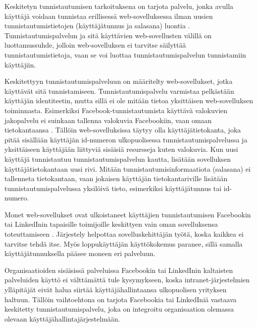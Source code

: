 Keskitetyn tunnistautumisen tarkoituksena on tarjota palvelu, jonka avulla käyttäjä voidaan tunnistaa erillisessä web-sovelluksessa ilman uusien tunnistautumistietojen (käyttäjätunnus ja salasana) luontia \cite{facebook}. Tunnistautumispalvelun ja sitä käyttävien web-sovellusten välillä on luottamussuhde, jolloin web-sovelluksen ei tarvitse säilyttää tunnistautumistietoja, vaan se voi luottaa tunnistautumispalvelun tunnistamiin käyttäjiin.

Keskitettyyn tunnistautumispalveluun on määritelty web-sovellukset, jotka käyttävät sitä tunnistamiseen. Tunnistautumispalvelu varmistaa pelkästään käyttäjän identiteetin, mutta sillä ei ole mitään tietoa yksittäisen web-sovelluksen toiminnasta. Esimerkiksi Facebook-tunnistautumista käyttävä valokuvien jakopalvelu ei suinkaan tallenna valokuvia Facebookiin, vaan omaan tietokantaansa \cite{web_resources}. Tällöin web-sovelluksissa täytyy olla käyttäjätietokanta, joka pitää sisällään käyttäjän id-numeron ulkopuolisessa tunnistautumispalvelussa ja yksittäiseen käyttäjään liittyviä sisäisiä resursseja kuten valokuvia. Kun uusi käyttäjä tunnistautuu tunnistautumispalvelun kautta, lisätään sovelluksen käyttäjätietokantaan uusi rivi. Mitään tunnistautumisinformaatiota (salasana) ei tallenneta tietokantaan, vaan jokaisen käyttäjän tietokantariville lisätään tunnistautumispalvelussa yksilöivä tieto, esimerkiksi käyttäjätunnus tai id-numero.

Monet web-sovellukset ovat ulkoistaneet käyttäjien tunnistautumisen Facebookin tai LinkedInin tapaisille toimijoille keskittyen vain oman sovelluksensa toteuttamiseen \cite{facebook}. Järjestely helpottaa sovelluskehittäjän työtä, koska kaikkea ei tarvitse tehdä itse. Myös loppukäyttäjän käyttökokemus paranee, sillä samalla käyttäjätunnuksella pääsee moneen eri palveluun.

Organisaatioiden sisäisissä palveluissa Facebookin tai LinkedInin kaltaisten palveluiden käyttö ei välttämättä tule kysymykseen, koska intranet-järjestelmien ylläpitäjät eivät halua siirtää käyttäjähallintaansa ulkopuolisen yrityksen haltuun. Tällöin vaihtoehtona on tarjota Facebookia tai LinkedIniä vastaava keskitetty tunnistautumispalvelu, joka on integroitu organisaation olemassa olevaan käyttäjähallintajärjestelmään.